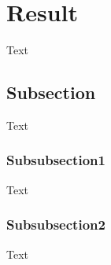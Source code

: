 \section{Result}
Text

\subsection{Subsection}
Text
\subsubsection{Subsubsection1}
Text
\subsubsection{Subsubsection2}
Text
